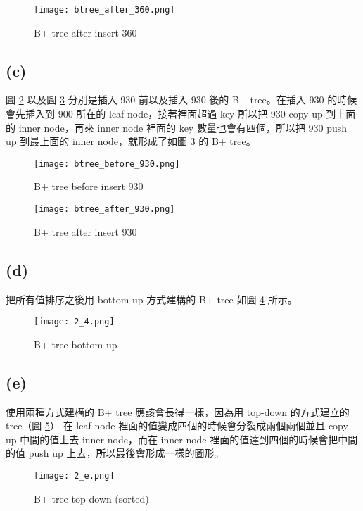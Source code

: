 \documentclass{article}
\begin{document}
\begin{figure}[H]
    \centering
    \texttt{[image: btree\_after\_360.png]}
    \caption{B+ tree after insert 360}
    \label{fig:2_b_2}
\end{figure}

\subsection*{(c)}
圖 \ref{fig:2_c_1} 以及圖 \ref{fig:2_c_2} 分別是插入 930 前以及插入 930 後的 B+ tree。在插入 930 的時候會先插入到 900 所在的 leaf node，接著裡面超過 key 所以把 930 copy up 到上面的 inner node，再來 inner node 裡面的 key 數量也會有四個，所以把 930 push up 到最上面的 inner node，就形成了如圖 \ref{fig:2_c_2} 的 B+ tree。
\begin{figure}[H]
    \centering
    \texttt{[image: btree\_before\_930.png]}
    \caption{B+ tree before insert 930}
    \label{fig:2_c_1}
\end{figure}

\begin{figure}[H]
    \centering
    \texttt{[image: btree\_after\_930.png]}
    \caption{B+ tree after insert 930}
    \label{fig:2_c_2}
\end{figure}

\subsection*{(d)}
把所有值排序之後用 bottom up 方式建構的 B+ tree 如圖 \ref{fig:2_d} 所示。
\begin{figure}[H]
    \centering
    \texttt{[image: 2\_4.png]}
    \caption{B+ tree bottom up}
    \label{fig:2_d}
\end{figure}

\subsection*{(e)}
使用兩種方式建構的 B+ tree 應該會長得一樣，因為用 top-down 的方式建立的 tree（圖 \ref{fig:2_e}） 在 leaf node 裡面的值變成四個的時候會分裂成兩個兩個並且 copy up 中間的值上去 inner node，而在 inner node 裡面的值達到四個的時候會把中間的值 push up 上去，所以最後會形成一樣的圖形。
\begin{figure}[H]
    \centering
    \texttt{[image: 2\_e.png]}
    \caption{B+ tree top-down (sorted)}
    \label{fig:2_e}
\end{figure}
\end{document}

